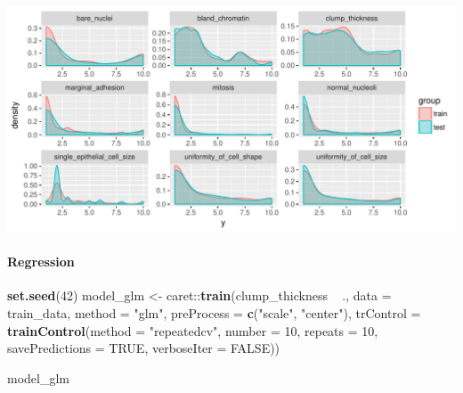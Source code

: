\documentclass[]{article}
\newenvironment{Shaded}{\begin{snugshade}}{\end{snugshade}}
\newcommand{\KeywordTok}[1]{\textcolor[rgb]{0.13,0.29,0.53}{\textbf{{#1}}}}
\newcommand{\DataTypeTok}[1]{\textcolor[rgb]{0.13,0.29,0.53}{{#1}}}
\newcommand{\DecValTok}[1]{\textcolor[rgb]{0.00,0.00,0.81}{{#1}}}
\newcommand{\StringTok}[1]{\textcolor[rgb]{0.31,0.60,0.02}{{#1}}}
\newcommand{\OtherTok}[1]{\textcolor[rgb]{0.56,0.35,0.01}{{#1}}}
\newcommand{\NormalTok}[1]{{#1}}
\let\oldparagraph\paragraph
\renewcommand{\paragraph}[1]{\oldparagraph{#1}\mbox{}}
\begin{document}
\begin{center}\includegraphics{webinar_code_files/figure-latex/distribution-1} \end{center}

\paragraph{Regression}\label{regression}

\begin{Shaded}
\begin{Highlighting}[]
\KeywordTok{set.seed}\NormalTok{(}\DecValTok{42}\NormalTok{)}
\NormalTok{model_glm <-}\StringTok{ }\NormalTok{caret::}\KeywordTok{train}\NormalTok{(clump_thickness ~}\StringTok{ }\NormalTok{.,}
                          \DataTypeTok{data =} \NormalTok{train_data,}
                          \DataTypeTok{method =} \StringTok{"glm"}\NormalTok{,}
                          \DataTypeTok{preProcess =} \KeywordTok{c}\NormalTok{(}\StringTok{"scale"}\NormalTok{, }\StringTok{"center"}\NormalTok{),}
                          \DataTypeTok{trControl =} \KeywordTok{trainControl}\NormalTok{(}\DataTypeTok{method =} \StringTok{"repeatedcv"}\NormalTok{, }
                                                  \DataTypeTok{number =} \DecValTok{10}\NormalTok{, }
                                                  \DataTypeTok{repeats =} \DecValTok{10}\NormalTok{, }
                                                  \DataTypeTok{savePredictions =} \OtherTok{TRUE}\NormalTok{, }
                                                  \DataTypeTok{verboseIter =} \OtherTok{FALSE}\NormalTok{))}
\end{Highlighting}
\end{Shaded}

\begin{Shaded}
\begin{Highlighting}[]
\NormalTok{model_glm}
\end{Highlighting}
\end{Shaded}
\end{document}
